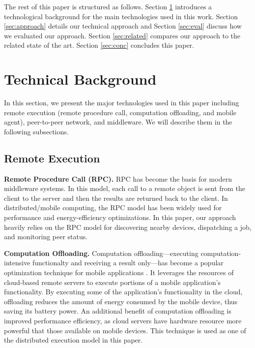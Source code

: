 \documentclass{sig-alternate}
\begin{document}

The rest of this paper is structured as follows. Section \ref{sec:background} introduces a technological background for the main technologies used in this work. Section \ref{sec:approach} details our technical approach and Section \ref{sec:eval} discuss how we evaluated our approach. Section \ref{sec:related} compares our approach to the related state of the art. Section \ref{sec:conc} concludes this paper.
 
\section{Technical Background}
\label{sec:background}
In this section, we present the major technologies used in this paper including remote execution (remote procedure call, computation offloading, and mobile agent), peer-to-peer network, and middleware. We will describe them in the following subsections.

\subsection{Remote Execution}   
\textbf{Remote Procedure Call (RPC).} RPC has become the basis for modern middleware systems. In this model, each call to a remote object is sent from the client to the server and then the results are returned back to the client. In distributed/mobile computing, the RPC model has been widely used for performance and energy-efficiency optimizations. In this paper, our approach heavily relies on the RPC model for discovering nearby devices, dispatching a job, and monitoring peer status.

\textbf{Computation Offloading.} Computation offloading---executing computation-intensive functionalty and receiving a result only---has become a popular optimization technique for mobile applications \cite{maui,chun+:eurosys11,kwon+:icsm13,wen2012energy}. It leverages the resources of cloud-based remote servers to execute portions of a mobile application's functionality. By executing some of the application's functionality in the cloud, offloading reduces the amount of energy consumed by the mobile device, thus saving its battery power. An additional benefit of computation offloading is improved performance efficiency, as cloud servers have hardware resource more powerful that those available on mobile devices. This technique is used as one of the distributed execution model in this paper.
\end{document}
